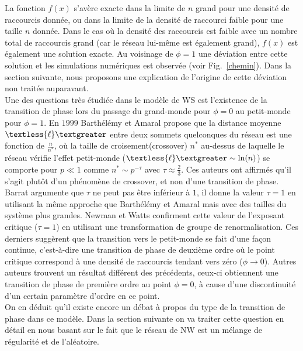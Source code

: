 La fonction $f(x)$ s'avère exacte dans la limite de $n$ grand pour une densité de raccourcis donnée, ou dans la limite de la densité de raccourci faible pour une taille $n$ donnée. Dans le cas où la densité des raccourcis est faible avec un nombre total de raccourcis grand (car le réseau lui-même est également grand), $f(x)$ est également une solution exacte. Au voisinage de $\phi=1$ une déviation entre cette solution  et les simulations numériques est observée (voir Fig.~\ref{chemin}). Dans la section suivante, nous proposons une explication de l'origine de cette déviation non traitée auparavant.\\
Une des questions très étudiée dans le modèle de WS est l'existence de la transition de phase lors du passage du grand-monde pour $\phi=0$ au petit-monde pour $\phi=1$. 
En $1999$ Barthélémy et Amaral \cite{Barthelemy-Amaral1999} propose que la distance moyenne $\textless {\ell} \textgreater$ entre deux sommets quelconques du réseau est une fonction de $\frac{n}{n^*}$, où la taille de croisement(crossover) $n^*$ au-dessus de laquelle le réseau vérifie l'effet petit-monde ($\textless {\ell} \textgreater\sim \ln(n)$) se comporte pour $p\ll1$ comme $n^*\sim p^{-\tau}$ avec $\tau \approx \frac{2}{3}$. Ces auteurs ont affirmés qu'il s'agit plutôt d'un phénomène de crossover, et non d'une transition de phase. Barrat \cite{Barrat} argumente que $\tau$ ne peut pas être inférieur à $1$, il donne la  valeur $\tau=1$ en utilisant la m\^{e}me approche que Barthélémy et Amaral mais avec des tailles du système plus grandes. Newman et Watts \cite{Newman-Watts1999-2,Newman-Watts1999-3} confirment cette valeur de l'exposant critique  ($\tau=1$) en utilisant une transformation de groupe de renormalisation. Ces derniers suggèrent que la transition vers le petit-monde se fait d'une façon continue, c'est-à-dire une transition de phase de deuxième ordre où le point critique correspond à une densité de raccourcis tendant vers zéro ($\phi \rightarrow 0$). Autres auteurs \cite{Argollo-al2000} trouvent un résultat différent des précédents, ceux-ci obtiennent une transition de phase de première ordre au point $\phi=0$, à cause d'une discontinuité d'un certain paramètre d'ordre en ce point. \\
On en déduit qu'il existe encore un débat à propos du type de la transition de phase dans ce modèle. Dans la section suivante on va traiter cette question en détail en nous basant sur le fait que le réseau de NW est un mélange de régularité et de l'aléatoire.
